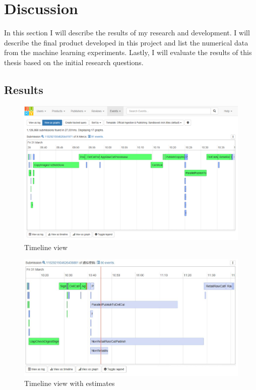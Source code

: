 
\clearpage
\section{Discussion}
\label{sec:discussion}

In this section I will describe the results of my research and development.
I will describe the final product developed in this project and list the numerical data from the machine learning experiments.
Lastly, I will evaluate the results of this thesis based on the initial research questions.

\subsection{Results}


\begin{figure}[htb]
\centering \includegraphics[width=\linewidth]{gfx/screenshots/timeline.png}
\caption{Timeline view \label{fig:timeline}}
\end{figure}

\begin{figure}[htb]
\centering \includegraphics[width=\linewidth]{gfx/screenshots/estimates.jpg}
\caption{Timeline view with estimates \label{fig:estimates}}
\end{figure}

